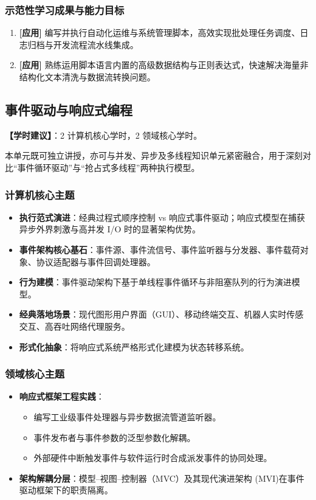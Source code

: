 \subsubsection{示范性学习成果与能力目标}
\begin{enumerate}
    \item \textbf{[应用]} 编写并执行自动化运维与系统管理脚本，高效实现批处理任务调度、日志归档与开发流程流水线集成。
    \item \textbf{[应用]} 熟练运用脚本语言内置的高级数据结构与正则表达式，快速解决海量非结构化文本清洗与数据流转换问题。
\end{enumerate}

\subsection{事件驱动与响应式编程}
\textbf{【学时建议】}：2 计算机核心学时，2 领域核心学时。

本单元既可独立讲授，亦可与并发、异步及多线程知识单元紧密融合，用于深刻对比“事件循环驱动”与“抢占式多线程”两种执行模型。

\subsubsection{计算机核心主题}
\begin{itemize}
    \item \textbf{执行范式演进}：经典过程式顺序控制 vs 响应式事件驱动；响应式模型在捕获异步外界刺激与高并发 I/O 时的显著架构优势。
    \item \textbf{事件架构核心基石}：事件源、事件流信号、事件监听器与分发器、事件载荷对象、协议适配器与事件回调处理器。
    \item \textbf{行为建模}：事件驱动架构下基于单线程事件循环与非阻塞队列的行为演进模型。
    \item \textbf{经典落地场景}：现代图形用户界面（GUI）、移动终端交互、机器人实时传感交互、高吞吐网络代理服务。
    \item \textbf{形式化抽象}：将响应式系统严格形式化建模为状态转移系统。
\end{itemize}

\subsubsection{领域核心主题}
\begin{itemize}
    \item \textbf{响应式框架工程实践}：
    \begin{itemize}
        \item 编写工业级事件处理器与异步数据流管道监听器。
        \item 事件发布者与事件参数的泛型参数化解耦。
        \item 外部硬件中断触发事件与软件运行时合成派发事件的协同处理。
    \end{itemize}
    \item \textbf{架构解耦分层}：模型--视图--控制器（MVC）及其现代演进架构 (MVI)在事件驱动框架下的职责隔离。
\end{itemize}


